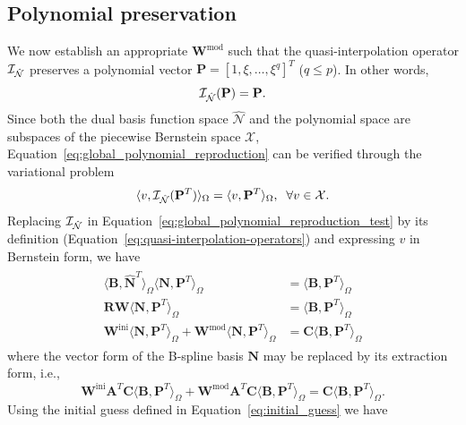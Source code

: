 \subsection{Polynomial preservation}
We now establish an appropriate $\mathbf{W}^\text{mod}$ such that the quasi-interpolation operator $\mathcal{I}_{\hat{\mathcal{N}}}$ preserves a polynomial vector $\mathbf{P}=\left[{1, \xi,\dots,\xi^q}\right]^T$ ($q\leq{}p$). In other words,
\begin{equation}
	\mathcal{I}_{\hat{\mathcal{N}}}(\mathbf{P})=\mathbf{P}.\label{eq:global_polynomial_reproduction}
\end{equation}
Since both the dual basis function space $\hat{\mathcal{N}}$ and the polynomial space are subspaces of the piecewise Bernstein space $\mathcal{X}$, Equation~\eqref{eq:global_polynomial_reproduction} can be verified through the variational problem
\begin{equation}
	\langle v,\mathcal{I}_{\hat{\mathcal{N}}}(\mathbf{P}^T)\rangle_\Omega=\langle v,\mathbf{P}^T\rangle_\Omega,\;\; \forall v\in \mathcal{X}.\label{eq:global_polynomial_reproduction_test}
\end{equation}
Replacing $\mathcal{I}_{\hat{\mathcal{N}}}$ in Equation~\eqref{eq:global_polynomial_reproduction_test} by its definition (Equation~\eqref{eq:quasi-interpolation-operators}) and expressing $v$ in Bernstein form, we have
\begin{align}
	\begin{split}
		\langle\mathbf{B},\hat{\mathbf{N}}^T\rangle_\Omega\langle\mathbf{N},\mathbf{P}^T\rangle_\Omega&=\langle\mathbf{B},\mathbf{P}^T\rangle_\Omega\\
		\mathbf{R}\mathbf{W}\langle\mathbf{N},\mathbf{P}^T\rangle_\Omega&=\langle\mathbf{B},\mathbf{P}^T\rangle_\Omega\\
		\mathbf{W}^\text{ini}\langle\mathbf{N},\mathbf{P}^T\rangle_\Omega+\mathbf{W}^\text{mod}\langle\mathbf{N},\mathbf{P}^T\rangle_\Omega&=\mathbf{C}\langle\mathbf{B},\mathbf{P}^T\rangle_\Omega
	\end{split}
\end{align}
where the vector form of the B-spline basis $\mathbf{N}$ may be replaced by its \Bezier extraction form, i.e.,
\begin{equation}
	\mathbf{W}^\text{ini}\mathbf{A}^T\mathbf{C}\langle\mathbf{B},\mathbf{P}^T\rangle_\Omega+\mathbf{W}^\text{mod}\mathbf{A}^T\mathbf{C}\langle\mathbf{B},\mathbf{P}^T\rangle_\Omega=\mathbf{C}\langle\mathbf{B},\mathbf{P}^T\rangle_\Omega.\label{eq:splited_global_polynomial_reproduction_test}
\end{equation}
Using the initial guess defined in Equation~\eqref{eq:initial_guess} we have
